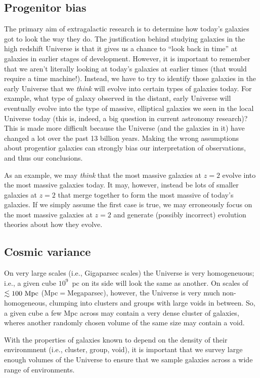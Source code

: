 \documentclass[11pt]{article}
\begin{document}
\subsection{Progenitor bias}
The primary aim of extragalactic research is to determine how today's
galaxies got to look the way they do. The justification behind
studying galaxies in the high redshift Universe is that it gives us a
chance to ``look back in time'' at galaxies in earlier stages of
development. However, it is important to remember that we aren't
literally looking at today's galaxies at earlier times (that would
require a time machine!). Instead, we have to try to identify those
galaxies in the early Universe that we {\it think} will evolve into
certain types of galaxies today. For example, what type of galaxy
observed in the distant, early Universe will eventually evolve into
the type of massive, elliptical galaxies we seen in the local Universe
today (this is, indeed, a big question in current astronomy research)?
This is made more difficult because the Universe (and the galaxies in
it) have changed a lot over the past 13 billion years. Making the
wrong assumptions about progentior galaxies can strongly bias our
interpretation of observations, and thus our conclusions.

As an example, we may {\it think} that the most massive galaxies at
$z=2$ evolve into the most massive galaxies today. It may, however,
instead be lots of smaller galaxies at $z=2$ that merge together to
form the most massive of today's galaxies. If we simply assume the
first case is true, we may erroneously focus on the most massive
galaxies at $z=2$ and generate (possibly incorrect) evolution theories
about how they evolve.

\subsection{Cosmic variance}

On very large scales (i.e., Gigaparsec scales) the Universe is very
homogeneuous; i.e., a given cube $10^9$~pc on its side will look the
same as another. On scales of $\lesssim 100~{\rm Mpc}$
(Mpc$=$Megaparsec), however, the Universe is very much
non-homogeneous, clumping into clusters and groups with large voids in
between. So, a given cube a few Mpc across may contain a very dense
cluster of galaxies, wheres another randomly chosen volume of the same
size may contain a void.

With the properties of galaxies known to depend on the density of
their environmnent (i.e., cluster, group, void), it is important that
we survey large enough volumes of the Universe to ensure that we
sample galaxies across a wide range of environments.
\end{document}
